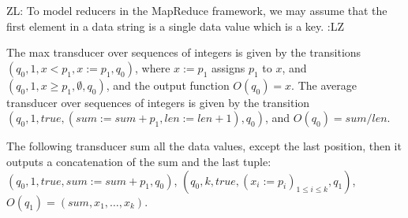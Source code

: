 \documentclass[runningheads,a4paper]{llncs}
\newcommand{\zhilin}[1]{\color{cyan} {ZL: #1 :LZ} \color{black}}
\begin{document}
\zhilin{To model reducers in the MapReduce framework, we may assume that the first element in a data string is a single data value which is a key.}

\begin{example}
The max transducer over sequences of integers is given by the transitions $(q_0, 1, x < p_1, x:=p_1, q_0)$, where $x:= p_1$ assigns $p_1$ to $x$, and $(q_0, 1, x \ge p_1 , \emptyset, q_0)$, and the output function $O(q_0)=x$. The average transducer over sequences of integers is given by the transition $(q_0, 1, true, (sum:=sum + p_1, len := len +1), q_0)$, and $O(q_0)=sum / len$. 
\end{example}

\begin{example}
The following transducer sum all the data values, except the last position, then it outputs a concatenation of the sum and the last tuple: $(q_0, 1, true, sum:= sum + p_1, q_0)$, $(q_0, k, true, (x_i:=p_i)_{1 \le i \le k}, q_1)$, $O(q_1)=(sum, x_1,\dots, x_k)$.
\end{example}
\end{document}

